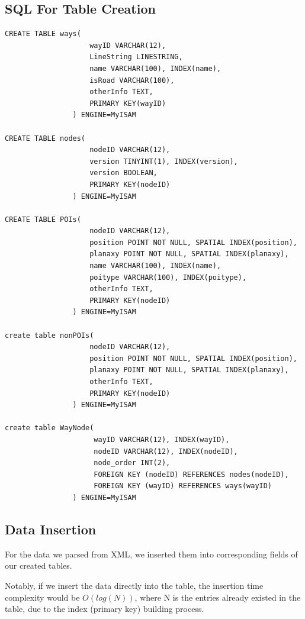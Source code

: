 \documentclass[final,1p,times]{elsarticle}
\begin{document}
\subsection{SQL For Table Creation}
\begin{verbatim}
CREATE TABLE ways(
          			wayID VARCHAR(12),
                    LineString LINESTRING,
                    name VARCHAR(100), INDEX(name),
                    isRoad VARCHAR(100),
                    otherInfo TEXT,
                    PRIMARY KEY(wayID)
                ) ENGINE=MyISAM
                
CREATE TABLE nodes(
                    nodeID VARCHAR(12),
                    version TINYINT(1), INDEX(version),
                    version BOOLEAN,
                    PRIMARY KEY(nodeID)
                ) ENGINE=MyISAM
                
CREATE TABLE POIs(
                    nodeID VARCHAR(12),
                    position POINT NOT NULL, SPATIAL INDEX(position),
                    planaxy POINT NOT NULL, SPATIAL INDEX(planaxy),
                    name VARCHAR(100), INDEX(name),
                    poitype VARCHAR(100), INDEX(poitype),
                    otherInfo TEXT,
                    PRIMARY KEY(nodeID)
                ) ENGINE=MyISAM
                
create table nonPOIs(
                    nodeID VARCHAR(12),
                    position POINT NOT NULL, SPATIAL INDEX(position),
                    planaxy POINT NOT NULL, SPATIAL INDEX(planaxy),
                    otherInfo TEXT,
                    PRIMARY KEY(nodeID)
                ) ENGINE=MyISAM
                
create table WayNode(
                     wayID VARCHAR(12), INDEX(wayID),
                     nodeID VARCHAR(12), INDEX(nodeID),
                     node_order INT(2),
                     FOREIGN KEY (nodeID) REFERENCES nodes(nodeID),
                     FOREIGN KEY (wayID) REFERENCES ways(wayID)
                ) ENGINE=MyISAM                
\end{verbatim}

\subsection{Data Insertion}
For the data we parsed from XML, we inserted them into corresponding fields of our created tables.

Notably, if we insert the data directly into the table, the insertion time complexity would be $O(log(N))$, where N is the entries already existed in the table, due to the index (primary key) building process.
\end{document}
